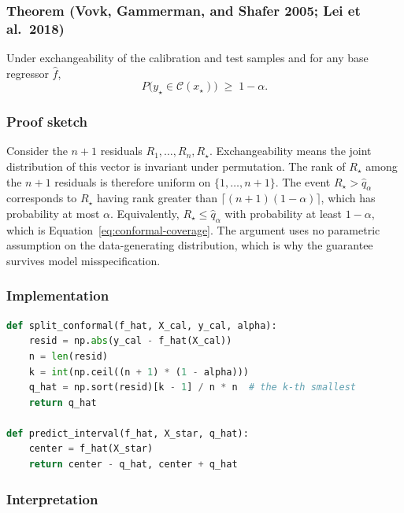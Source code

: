\documentclass{article}
\begin{document}
\subsubsection*{Theorem (Vovk, Gammerman, and Shafer 2005; Lei et al.\ 2018)}

Under exchangeability of the calibration and test samples and for any base regressor $\hat f$,
\begin{equation}
P\bigl(y_\star \in \mathcal{C}(x_\star)\bigr) \;\geq\; 1 - \alpha.
\label{eq:conformal-coverage}
\end{equation}

\subsubsection*{Proof sketch}

Consider the $n + 1$ residuals $R_1, \ldots, R_n, R_\star$. Exchangeability means the joint distribution of this vector is invariant under permutation. The rank of $R_\star$ among the $n + 1$ residuals is therefore uniform on $\{1, \ldots, n+1\}$. The event $R_\star > \hat q_\alpha$ corresponds to $R_\star$ having rank greater than $\lceil (n+1)(1 - \alpha)\rceil$, which has probability at most $\alpha$. Equivalently, $R_\star \leq \hat q_\alpha$ with probability at least $1 - \alpha$, which is Equation~\ref{eq:conformal-coverage}. The argument uses no parametric assumption on the data-generating distribution, which is why the guarantee survives model misspecification.

\subsubsection*{Implementation}

\begin{lstlisting}[language=Python]
def split_conformal(f_hat, X_cal, y_cal, alpha):
    resid = np.abs(y_cal - f_hat(X_cal))
    n = len(resid)
    k = int(np.ceil((n + 1) * (1 - alpha)))
    q_hat = np.sort(resid)[k - 1] / n * n  # the k-th smallest
    return q_hat

def predict_interval(f_hat, X_star, q_hat):
    center = f_hat(X_star)
    return center - q_hat, center + q_hat
\end{lstlisting}

\subsubsection*{Interpretation}
\end{document}
